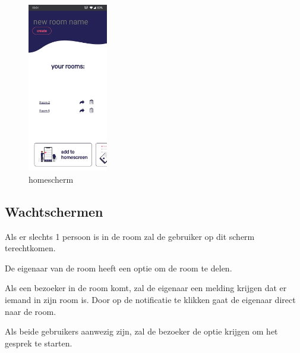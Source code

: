 			\begin{figure}[H]
				\centering
				\includegraphics[width=35mm]{./img/POC/home}{}		
				\caption{homescherm}
			\end{figure}
		
		
		
	\subsection{Wachtschermen}
		Als er slechts 1 persoon is in de room zal de gebruiker op dit scherm terechtkomen. 
		
		De eigenaar van de room heeft een optie om de room te delen. 
		
		Als een bezoeker in de room komt, zal de eigenaar een melding krijgen dat er iemand in zijn room is. Door op de notificatie te klikken gaat de eigenaar direct naar de room.
						
		Als beide gebruikers aanwezig zijn, zal de bezoeker de optie krijgen om het gesprek te starten.
		

